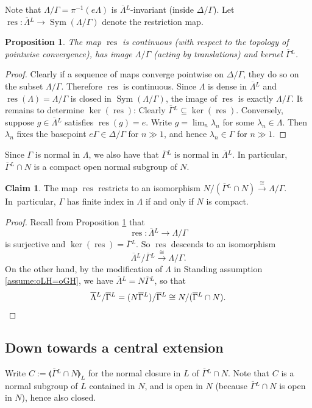 \documentclass[11pt]{article}
\numberwithin{equation}{section}\providecommand{\llangle}{\langle\!\langle}\providecommand{\rrangle}{\rangle\!\rangle}\providecommand{\Asterisk}{\ast}
\newcommand{\oGL}{\ensuremath{\overline{\Gamma}{}^L}}
\newcommand{\oLL}{\ensuremath{\overline{\Lambda}{}^L}}
\DeclareMathOperator{\Sym}{Sym}
\DeclareMathOperator{\res}{res}
\newtheorem{prop}[thm]{Proposition}
\theoremstyle{definition}
\newtheorem{claim}[thm]{Claim}
\begin{document}
Note that $\Lambda / \Gamma = \pi^{-1}(e\Lambda)$ is $\oLL$-invariant (inside $\Delta / \Gamma$). Let $\res:\oLL\to \Sym(\Lambda/\Gamma)$ denote the restriction map.
\begin{prop}\label{prop:res}
The map $\res$ is continuous (with respect to the topology of pointwise convergence), has image $\Lambda/\Gamma$ (acting by translations) and kernel $\oGL$.
\end{prop}
\begin{proof} Clearly if a sequence of maps converge pointwise on $\Delta/\Gamma$, they do so on the subset $\Lambda/\Gamma$. Therefore $\res$ is continuous. Since $\Lambda$ is dense in $\oLL$ and $\res(\Lambda)=\Lambda/\Gamma$ is closed in $\Sym(\Lambda/\Gamma)$, the image of $\res$ is exactly $\Lambda/\Gamma$. It remains to determine $\ker(\res)$: Clearly $\oGL\subseteq \ker(\res)$. Conversely, suppose $g\in\oLL$ satisfies $\res(g)=e$. Write $g=\lim_n \lambda_n$ for some $\lambda_n\in\Lambda$. Then $\lambda_n$ fixes the basepoint $e\Gamma\in\Delta/\Gamma$ for $n \gg 1$, and hence $\lambda_n\in\Gamma$ for $n \gg 1$.\end{proof}
Since $\Gamma$ is normal in $\Lambda$, we also have that $\oGL$ is normal in $\oLL$. In particular, $\oGL\cap N$ is a compact open normal subgroup of $N$.

\begin{claim}\label{claim:res-res-iso}
The map $\res$ restricts to an isomorphism $N/(\oGL\cap N)\overset{\cong}{\longrightarrow} \Lambda/\Gamma$. In~particular, $\Gamma$ has finite index in $\Lambda$ if and only if $N$ is compact.
\end{claim}
\begin{proof} Recall from Proposition \ref{prop:res} that
\[
\res:\oLL\to \Lambda/\Gamma
\]
is surjective and $\ker(\res)=\oGL$. So $\res$ descends to an isomorphism
\[
\oLL/\oGL\overset{\cong}{\to} \Lambda/\Gamma.
\]
On the other hand, by the modification of $\Lambda$ in Standing assumption \ref{assume:oLH=oGH}, we have $\oLL=N\oGL$, so that
\[
\oLL/\oGL = (N\oGL)/\oGL \cong N/(\oGL\cap N).\qedhere
\]
\end{proof}

\subsection{Down towards a central extension}\label{sec:down}
Write $C:= \llangle \oGL\cap N\rrangle_L$ for the normal closure in $L$ of $\oGL\cap N$. Note that $C$ is a normal subgroup of $L$ contained in $N$, and is open in $N$ (because $\oGL\cap N$ is open in $N$), hence also closed.
\end{document}
